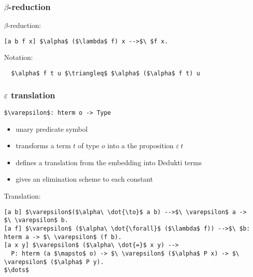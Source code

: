 \begin{frame}[fragile]
\frametitle{$\beta$-reduction}

\begin{block}{$\beta$-reduction:}
\begin{lstlisting}
[a b f x] $\alpha$ ($\lambda$ f) x -->$\ $f x.
\end{lstlisting}
\end{block}

\vspace{0.5cm}

\begin{block}{Notation:}
\begin{lstlisting}
  $\alpha$ f t u $\triangleq$ $\alpha$ ($\alpha$ f t) u
\end{lstlisting}
\end{block}
\end{frame}


\begin{frame}[fragile]
\frametitle{$\varepsilon$ translation}

\lstinline!$\varepsilon$: hterm o -> Type!
\begin{itemize}
\item unary predicate symbol
\item transforms a term $t$ of type $o$ into a the proposition
  $\varepsilon\ t$
\item defines a translation from the embedding into Dedukti terms
\item \alert{gives an elimination scheme to each constant}
\end{itemize}

\vspace{0.5cm}

\begin{block}{Translation:}
\begin{lstlisting}
[a b] $\varepsilon$($\alpha\ \dot{\to}$ a b) -->$\ \varepsilon$ a -> $\ \varepsilon$ b.
[a f] $\varepsilon$ ($\alpha\ \dot{\forall}$ ($\lambda$ f)) -->$\ $b: hterm a -> $\ \varepsilon$ (f b).
[a x y] $\varepsilon$ ($\alpha\ \dot{=}$ x y) -->
  P: hterm (a $\mapsto$ o) -> $\ \varepsilon$ ($\alpha$ P x) -> $\ \varepsilon$ ($\alpha$ P y).
$\dots$
\end{lstlisting}
\end{block}

\end{frame}



